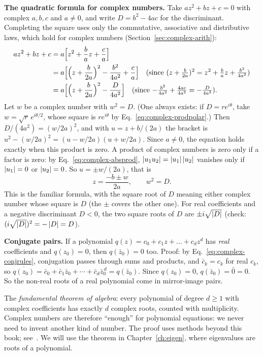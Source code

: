 \textbf{The quadratic formula for complex numbers.} Take $az^2+bz+c=0$ with complex $a,b,c$ and $a\ne0$, and write $D=b^2-4ac$ for the discriminant. Completing the square uses only the commutative, associative and distributive laws, which hold for complex numbers (Section~\ref{sec:complex-arith}):
\begin{align*}
az^2+bz+c&=a\Bigl[z^2+\frac{b}{a}z+\frac{c}{a}\Bigr]\\
&=a\Bigl[\Bigl(z+\frac{b}{2a}\Bigr)^2-\frac{b^2}{4a^2}+\frac{c}{a}\Bigr]\quad\text{(since $(z+\tfrac{b}{2a})^2=z^2+\tfrac{b}{a}z+\tfrac{b^2}{4a^2}$)}\\
&=a\Bigl[\Bigl(z+\frac{b}{2a}\Bigr)^2-\frac{D}{4a^2}\Bigr]\quad\text{(since $-\tfrac{b^2}{4a^2}+\tfrac{4ac}{4a^2}=-\tfrac{D}{4a^2}$)}.
\end{align*}
Let $w$ be a complex number with $w^2=D$. (One always exists: if $D=re^{i\theta}$, take $w=\sqrt r\,e^{i\theta/2}$, whose square is $re^{i\theta}$ by Eq.~\eqref{eq:complex-prodpolar}.) Then $D/(4a^2)=(w/2a)^2$, and with $u=z+b/(2a)$ the bracket is $u^2-(w/2a)^2=(u-w/2a)(u+w/2a)$. Since $a\ne0$, the equation holds exactly when this product is zero. A product of complex numbers is zero only if a factor is zero: by Eq.~\eqref{eq:complex-absprod}, $\left\lvert u_1u_2\right\rvert=\left\lvert u_1\right\rvert\left\lvert u_2\right\rvert$ vanishes only if $\left\lvert u_1\right\rvert=0$ or $\left\lvert u_2\right\rvert=0$. So $u=\pm w/(2a)$, that is
\[
z=\frac{-b\pm w}{2a},\qquad w^2=D .
\]
This is the familiar formula, with the square root of $D$ meaning either complex number whose square is $D$ (the $\pm$ covers the other one). For real coefficients and a negative discriminant $D<0$, the two square roots of $D$ are $\pm i\sqrt{\left\lvert D\right\rvert}$ (check: $(i\sqrt{\left\lvert D\right\rvert})^2=-\left\lvert D\right\rvert=D$).

\textbf{Conjugate pairs.} If a polynomial $q(z)=c_0+c_1z+\dots+c_dz^d$ has \emph{real} coefficients and $q(z_0)=0$, then $q(\bar z_0)=0$ too. Proof: by Eq.~\eqref{eq:complex-conjrules}, conjugation passes through sums and products, and $\bar c_k=c_k$ for real $c_k$, so $\overline{q(z_0)}=\bar c_0+\bar c_1\bar z_0+\cdots+\bar c_d\bar z_0^{\,d}=q(\bar z_0)$. Since $q(z_0)=0$, $q(\bar z_0)=\bar0=0$. So the non-real roots of a real polynomial come in mirror-image pairs.

\begin{beyond}
The \emph{fundamental theorem of algebra}: every polynomial of degree $d\ge1$ with complex coefficients has exactly $d$ complex roots, counted with multiplicity. Complex numbers are therefore ``enough'' for polynomial equations: we never need to invent another kind of number. The proof uses methods beyond this book; see~\cite{rhb}. We will use the theorem in Chapter~\ref{ch:eigen}, where eigenvalues are roots of a polynomial.
\end{beyond}


